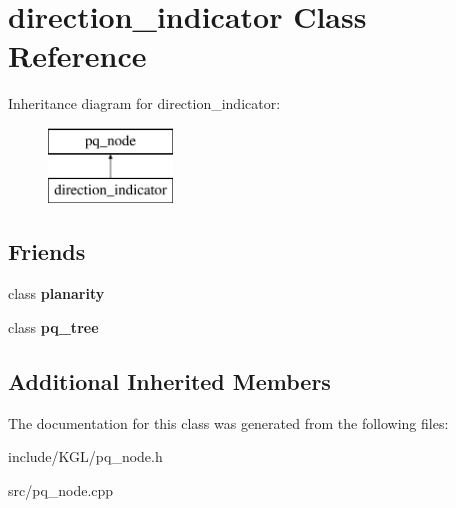 \hypertarget{classdirection__indicator}{}\section{direction\+\_\+indicator Class Reference}
\label{classdirection__indicator}
Inheritance diagram for direction\+\_\+indicator\+:\begin{figure}[H]
\begin{center}
\leavevmode
\includegraphics[height=2.000000cm]{classdirection__indicator}
\end{center}
\end{figure}
\subsection*{Friends}
\begin{DoxyCompactItemize}
\item 
\mbox{\label{classdirection__indicator_ab6a02224dbc06343d95919289aec77c8}} 
class {\bfseries planarity}
\item 
\mbox{\label{classdirection__indicator_a0a5be4bb438c891059fae98f607f2a9c}} 
class {\bfseries pq\+\_\+tree}
\end{DoxyCompactItemize}
\subsection*{Additional Inherited Members}


The documentation for this class was generated from the following files\+:\begin{DoxyCompactItemize}
\item 
include/\+K\+G\+L/pq\+\_\+node.\+h\item 
src/pq\+\_\+node.\+cpp\end{DoxyCompactItemize}

